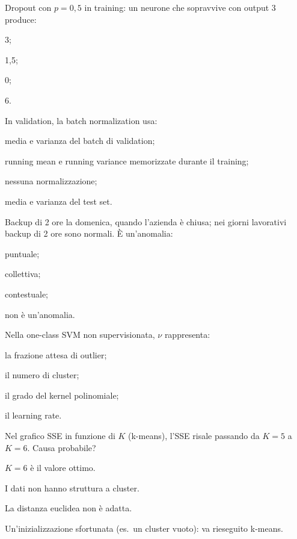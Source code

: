 \begin{domanda}[dropout]\label{quiz:m35}
Dropout con $p = 0{,}5$ in training: un neurone che sopravvive con output 3 produce:
\begin{opzioni}
  \item 3;
  \item 1,5;
  \item 0;
  \item 6.
\end{opzioni}
\end{domanda}

\begin{domanda}\label{quiz:m36}
In validation, la batch normalization usa:
\begin{opzioni}
  \item media e varianza del batch di validation;
  \item running mean e running variance memorizzate durante il training;
  \item nessuna normalizzazione;
  \item media e varianza del test set.
\end{opzioni}
\end{domanda}

\begin{domanda}\label{quiz:m37}
Backup di 2 ore la domenica, quando l'azienda è chiusa; nei giorni lavorativi backup di 2 ore sono normali. È un'anomalia:
\begin{opzioni}
  \item puntuale;
  \item collettiva;
  \item contestuale;
  \item non è un'anomalia.
\end{opzioni}
\end{domanda}

\begin{domanda}\label{quiz:m38}
Nella one-class SVM non supervisionata, $\nu$ rappresenta:
\begin{opzioni}
  \item la frazione attesa di outlier;
  \item il numero di cluster;
  \item il grado del kernel polinomiale;
  \item il learning rate.
\end{opzioni}
\end{domanda}

\begin{domanda}[k-means]\label{quiz:m39}
Nel grafico SSE in funzione di $K$ (k-means), l'SSE risale passando da $K=5$ a $K=6$. Causa probabile?
\begin{opzioni}
  \item $K=6$ è il valore ottimo.
  \item I dati non hanno struttura a cluster.
  \item La distanza euclidea non è adatta.
  \item Un'inizializzazione sfortunata (es.\ un cluster vuoto): va rieseguito k-means.
\end{opzioni}
\end{domanda}

